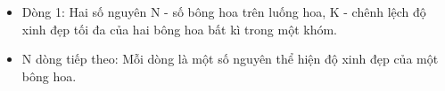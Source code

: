 \begin{itemize}
	\item     Dòng 1: Hai số nguyên N - số bông hoa trên luống hoa, K - chênh lệch độ xinh đẹp tối đa của hai bông hoa bất kì trong một khóm.   
	\item     N dòng tiếp theo: Mỗi dòng là một số nguyên thể hiện độ xinh đẹp của một bông hoa.   
\end{itemize}